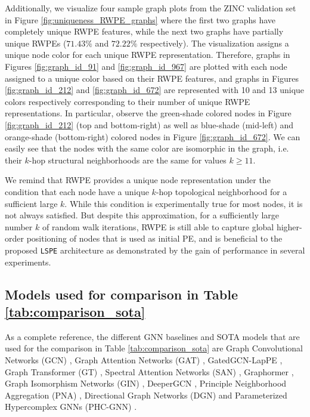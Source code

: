 \documentclass{article} \usepackage{iclr2021_conference,times}
\begin{document}
Additionally, we visualize four sample graph plots from the ZINC validation set in Figure \ref{fig:uniqueness_RWPE_graphs} where the first two graphs have completely unique RWPE features, while the next two graphs have partially unique RWPEs ($71.43\%$ and $72.22\%$ respectively). The visualization assigns a unique node color for each unique  RWPE representation. Therefore, graphs in Figures \ref{fig:graph_id_91} and \ref{fig:graph_id_967} are plotted with each node assigned to a unique color based on their RWPE features, and graphs in Figures \ref{fig:graph_id_212} and \ref{fig:graph_id_672} are represented with 10 and 13 unique colors respectively corresponding to their number of unique RWPE representations. In particular, observe the green-shade colored nodes in Figure \ref{fig:graph_id_212} (top and bottom-right) as well as blue-shade (mid-left) and orange-shade (bottom-right) colored nodes in Figure \ref{fig:graph_id_672}. We can easily see that the nodes with the same color are isomorphic in the graph, i.e. their $k$-hop structural neighborhoods are the same for values $k\geq 11$. 


We remind that RWPE provides a unique node representation under the condition that each node have a unique $k$-hop topological neighborhood for a sufficient large $k$. While this condition is experimentally true for most nodes, it is not always satisfied. But despite this approximation, for a sufficiently large number $k$ of random walk iterations, RWPE is still able to capture global higher-order positioning of nodes that is used as initial PE, and is beneficial to the proposed \texttt{LSPE} architecture as demonstrated by the gain of performance in several experiments. 





\subsection{Models used for comparison in Table \ref{tab:comparison_sota}}
\label{sec:models_comparison_sota}
As a complete reference, the different GNN baselines and SOTA models that are used for the comparison in Table \ref{tab:comparison_sota} are Graph Convolutional Networks (GCN) \citep{kipf2017semi}, Graph Attention Networks (GAT) \citep{velivckovic2018graph}, GatedGCN-LapPE \citep{bresson2017residual, dwivedi2020benchmarking}, Graph Transformer (GT) \citep{dwivedi2021generalization}, Spectral Attention Networks (SAN) \citep{kreuzer2021rethinking}, Graphormer \citep{ying2021transformers}, Graph Isomorphism Networks (GIN) \citep{xu2018how}, DeeperGCN \citep{li2020deepergcn}, Principle Neighborhood Aggregation (PNA) \citep{corso2020principal}, Directional Graph Networks (DGN) \citep{beani2021directional} and Parameterized Hypercomplex GNNs (PHC-GNN) \citep{le2021parameterized}.
\end{document}
